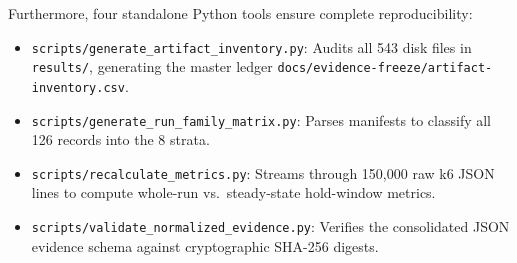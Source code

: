 Furthermore, four standalone Python tools ensure complete reproducibility:
\begin{itemize}
  \item \texttt{scripts/generate\_artifact\_inventory.py}: Audits all 543 disk files in \texttt{results/}, generating the master ledger \texttt{docs/\allowbreak evidence-freeze/\allowbreak artifact-inventory.csv}.
  \item \texttt{scripts/generate\_run\_family\_matrix.py}: Parses manifests to classify all 126 records into the 8 strata.
  \item \texttt{scripts/recalculate\_metrics.py}: Streams through 150,000 raw k6 JSON lines to compute whole-run vs.\ steady-state hold-window metrics.
  \item \texttt{scripts/validate\_normalized\_evidence.py}: Verifies the consolidated JSON evidence schema against cryptographic SHA-256 digests.
\end{itemize}
